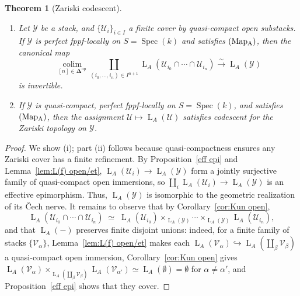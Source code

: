 \documentclass[12pt, oneside]{amsart}
\numberwithin{equation}{section}
\newtheorem{theorem}[subsubsection]{Theorem}
\theoremstyle{remark}
\theoremstyle{plain}
\newcommand{\Loop}{\operatorname{L}}
\newcommand{\YY}{\mathcal{Y}}
\DeclareMathOperator{\spc}{Spec}
\newcommand{\UU}{\mathcal{U}}
\begin{document}
\begin{theorem}[Zariski codescent]\label{Zarcosh}\leavevmode
  \begin{enumerate}
    \item Let $\YY$ be a stack, and $\{\UU_i\}_{i \in I}$ a finite cover by quasi-compact open substacks.
    If $\YY$ is perfect fppf-locally on $S=\spc(k)$ and satisfies $(\textup{Map}\textsubscript{A})$, then the canonical map
    $$\operatorname*{colim}_{[n] \in \mathbf{\Delta}^{\mathrm{op}}} \coprod_{(i_0,\ldots,i_n) \in I^{n+1}} \Loop_A(\UU_{i_0} \cap \cdots \cap \UU_{i_n}) \xrightarrow{\;\sim\;} \Loop_A(\YY)$$
    is invertible.

    \item If $\YY$ is quasi-compact, perfect fppf-locally on $S=\spc(k)$, and satisfies $(\textup{Map}\textsubscript{A})$, then the assignment $\UU \mapsto \Loop_A(\UU)$ satisfies codescent for the Zariski topology on $\YY$.
  \end{enumerate}
\end{theorem}
\begin{proof}
  We show (i); part (ii) follows because quasi-compactness ensures any Zariski cover has a finite refinement.
  By Proposition~\ref{eff epi} and Lemma~\ref{lem:L(f) open/et}, $\Loop_A(\UU_i) \to \Loop_A(\YY)$ form a jointly surjective family of quasi-compact open immersions, so $\coprod_i \Loop_A(\UU_i) \to \Loop_A(\YY)$ is an effective epimorphism.
  Thus, $\Loop_A(\YY)$ is isomorphic to the geometric realization of its \v{C}ech nerve.
  It remains to observe that by Corollary~\ref{cor:Kun open},
  $$\Loop_A(\UU_{i_0} \cap \cdots \cap \UU_{i_n}) \;\simeq\; \Loop_A(\UU_{i_0}) \times_{\Loop_A(\YY)} \cdots \times_{\Loop_A(\YY)} \Loop_A(\UU_{i_n}),$$
  and that $\Loop_A(-)$ preserves finite disjoint unions: indeed, for a finite family of stacks $\{\mathcal{V}_\alpha\}$, Lemma~\ref{lem:L(f) open/et} makes each $\Loop_A(\mathcal{V}_\alpha) \hookrightarrow \Loop_A(\coprod_\beta \mathcal{V}_\beta)$ a quasi-compact open immersion, Corollary~\ref{cor:Kun open} gives $\Loop_A(\mathcal{V}_\alpha) \times_{\Loop_A(\coprod_\beta \mathcal{V}_\beta)} \Loop_A(\mathcal{V}_{\alpha'}) \simeq \Loop_A(\emptyset) = \emptyset$ for $\alpha \ne \alpha'$, and Proposition~\ref{eff epi} shows that they cover.
\end{proof}
\end{document}
